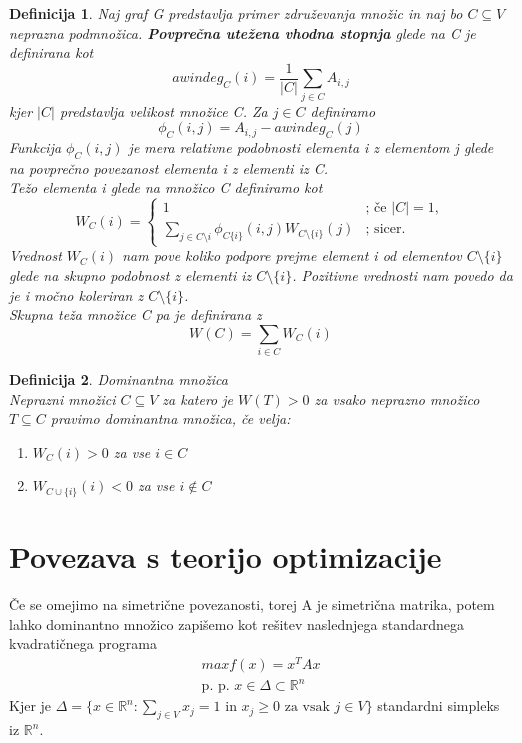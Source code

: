 \documentclass[a4paper]{article}
\newtheorem{definition}{Definicija}[section]
\begin{document}
\begin{definition}
Naj graf G predstavlja primer združevanja množic in naj bo $C \subseteq V$ neprazna podmnožica. \textbf{Povprečna utežena vhodna stopnja} glede na C je definirana kot
$$awindeg_C(i) = \frac{1}{\lvert C \rvert}\sum_{j\in C}A_{i,j}$$
kjer $\lvert C \rvert$ predstavlja velikost množice C. Za $j\in C$ definiramo
$$\phi_C(i,j) = A_{i,j} - awindeg_C(j)$$
Funkcija $\phi_C(i,j)$ je \textit{mera relativne podobnosti} elementa i z elementom j glede na povprečno povezanost elementa i z elementi iz C.\\
\textit{Težo elementa} i glede na množico C definiramo kot
$$W_C(i)=\begin{cases}
1& \text{; če $\lvert C \rvert = 1$},\\
\sum_{j\in C\setminus{i}}\phi_{C\{i\}}(i,j)W_{C\setminus\{i\}}(j)& \text{; sicer}.
\end{cases}$$
Vrednost $W_C(i)$ nam pove koliko podpore prejme element i od elementov $C\setminus\{i\}$ glede na skupno podobnost z elementi iz $C\setminus\{i\}$. Pozitivne vrednosti nam povedo da je i močno
koleriran z $C\setminus\{i\}$.\\
\textit{Skupna teža množice} C pa je definirana z
$$W(C) = \sum_{i\in C}W_C(i)$$
\end{definition}
\begin{definition}{Dominantna množica}\\
Neprazni množici $C \subseteq V$ za katero je $W(T) > 0$ za vsako neprazno množico $T \subseteq C$ pravimo dominantna množica, če velja:
\begin{enumerate}
\item $W_C(i) > 0$ za vse $i \in C$
\item $W_{C\cup\{i\}}(i) < 0$ za vse $i \notin C$
\end{enumerate}
\end{definition}



\section{Povezava s teorijo optimizacije}
Če se omejimo na simetrične povezanosti, torej A je simetrična matrika, potem lahko dominantno množico zapišemo kot rešitev naslednjega standardnega kvadratičnega programa
\begin{gather}
max f(x) = x^T A x \\
\text{p. p. } x\in\Delta \subset \mathbb{R}^n
\end{gather}
Kjer je $\Delta = \{x\in\mathbb{R}^n: \sum_{j\in V}x_j = 1 \text{ in } x_j \geq 0 \text{ za vsak } j\in V\}$ standardni simpleks iz $\mathbb{R}^n$.
\end{document}
